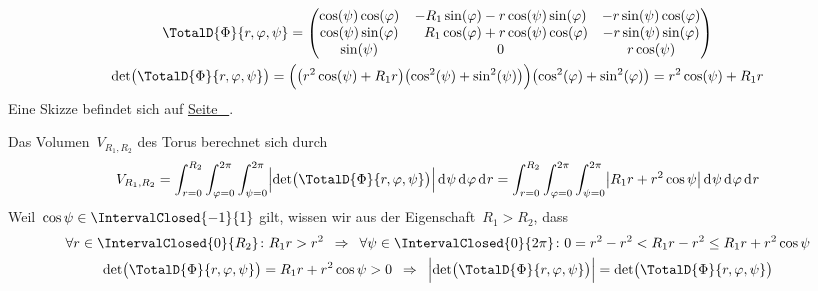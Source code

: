 \documentclass[../full]{subfiles}
\begin{document}
    \begin{gather*}
        \TotalD{\Phi}{r, \varphi, \psi}
        = \begin{pmatrix}
            \cos \paren{\psi} \cos \paren{\varphi}
                & -R_1 \sin \paren{\varphi}
                    - r \cos \paren{\psi}  \sin \paren{\varphi}
                & -r \sin \paren{\psi} \cos \paren{\varphi}
            \\
            \cos \paren{\psi} \sin \paren{\varphi}
                & \phantom{-} R_1 \cos \paren{\varphi}
                    + r \cos \paren{\psi} \cos \paren{\varphi}
                & -r \sin \paren{\psi} \sin \paren{\varphi}
            \\
            \sin \paren{\psi}
                & 0
                & r \cos \paren{\psi}
        \end{pmatrix}
        \\
        \det \paren[\big]{\TotalD{\Phi}{r, \varphi, \psi}}
        = \paren[\Big]{
            \paren[\big]{r^2 \cos \paren{\psi} + R_1 r}
            \paren[\big]{\cos^2 \paren{\psi} + \sin^2 \paren{\psi}}
        } \paren[\big]{\cos^2 \paren{\varphi} + \sin^2 \paren{\varphi}}
        = r^2 \cos \paren{\psi} + R_1 r
    \end{gather*}
    Eine Skizze befindet sich auf \hyperref[task:torus:3d:sketch:visual]{%
        Seite~\pageref*{task:torus:3d:sketch:visual}%
    }.



    Das Volumen~\( V_{R_1, R_2} \) des Torus berechnet sich durch
    \begin{equation*}
        V_{R_1, R_2}
        = \int_{r = 0}^{R_2}
            \int_{\varphi = 0}^{2 \pi}
                \int_{\psi = 0}^{2 \pi}
                    \abs[\Big]
                        {\det \paren[\big]{\TotalD{\Phi}{r, \varphi, \psi}}}
                \dx[\psi]
            \dx[\varphi]
        \dx[r]
        = \int_{r = 0}^{R_2}
            \int_{\varphi = 0}^{2 \pi}
                \int_{\psi = 0}^{2 \pi}
                    \abs[\big]{R_1 r + r^2 \cos \psi}
                \dx[\psi]
            \dx[\varphi]
        \dx[r]
    \end{equation*}
    Weil~\( \cos \psi \in \IntervalClosed{-1}{1} \) gilt,
    wissen wir aus der Eigenschaft~\( R_1 > R_2 \),
    dass
    \begin{gather*}
        \forall r \in \IntervalClosed{0}{R_2} \colon R_1 r > r^2
        \enspace \Rightarrow \enspace
        \forall \psi \in \IntervalClosed{0}{2 \pi} \colon
            0 = r^2 - r^2 < R_1 r - r^2 \leq R_1 r + r^2 \cos \psi
        \\
        \det \paren[\big]{\TotalD{\Phi}{r, \varphi, \psi}}
        = R_1 r + r^2 \cos \psi
        > 0
        \enspace \Rightarrow \enspace
        \abs[\Big]{\det \paren[\big]{\TotalD{\Phi}{r, \varphi, \psi}}}
        = \det \paren[\big]{\TotalD{\Phi}{r, \varphi, \psi}}
    \end{gather*}
\end{document}
